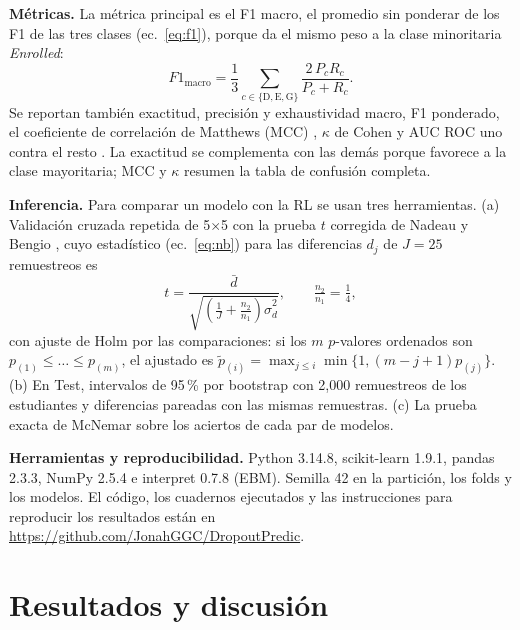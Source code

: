 \documentclass[conference]{IEEEtran}
\newcommand{\repoURL}{https://github.com/JonahGGC/DropoutPredic}   %
\newcommand{\cE}{\emph{Enrolled}}
\begin{document}


\textbf{Métricas.} La métrica principal es el F1 macro, el promedio sin ponderar de los F1 de las tres clases (ec.~\ref{eq:f1}), porque da el mismo peso a la clase minoritaria \cE:
\begin{equation}
F1_{\mathrm{macro}}=\frac13\sum_{c\in\{\mathrm{D},\mathrm{E},\mathrm{G}\}}\frac{2\,P_c R_c}{P_c+R_c}.
\label{eq:f1}
\end{equation}
Se reportan también exactitud, precisión y exhaustividad macro, F1 ponderado, el coeficiente de correlación de Matthews (MCC) \cite{matthews1975}, $\kappa$ de Cohen \cite{cohen1960} y AUC ROC uno contra el resto \cite{fawcett2006}. La exactitud se complementa con las demás porque favorece a la clase mayoritaria; MCC y $\kappa$ resumen la tabla de confusión completa.

\textbf{Inferencia.} Para comparar un modelo con la RL se usan tres herramientas. (a) Validación cruzada repetida de 5$\times$5 con la prueba $t$ corregida de Nadeau y Bengio \cite{nadeau2003}, cuyo estadístico (ec.~\ref{eq:nb}) para las diferencias $d_j$ de $J=25$ remuestreos es
\begin{equation}
t=\frac{\bar d}{\sqrt{\left(\tfrac1J+\tfrac{n_2}{n_1}\right)\hat\sigma_d^2}},\qquad \tfrac{n_2}{n_1}=\tfrac14,
\label{eq:nb}
\end{equation}
con ajuste de Holm \cite{holm1979} por las comparaciones: si los $m$ $p$-valores ordenados son $p_{(1)}\le\dots\le p_{(m)}$, el ajustado es $\tilde p_{(i)}=\max_{j\le i}\min\{1,(m-j+1)p_{(j)}\}$. (b) En Test, intervalos de 95\,\% por bootstrap \cite{efron1979} con 2,000 remuestreos de los \Nte{} estudiantes y diferencias pareadas con las mismas remuestras. (c) La prueba exacta de McNemar \cite{mcnemar1947} sobre los aciertos de cada par de modelos.

\textbf{Herramientas y reproducibilidad.} Python 3.14.8, scikit-learn 1.9.1, pandas 2.3.3, NumPy 2.5.4 e interpret 0.7.8 (EBM). Semilla 42 en la partición, los folds y los modelos. El código, los cuadernos ejecutados y las instrucciones para reproducir los resultados están en \expandafter\url\expandafter{\repoURL}.

\section{Resultados y discusión}\label{sec:res}
\end{document}
